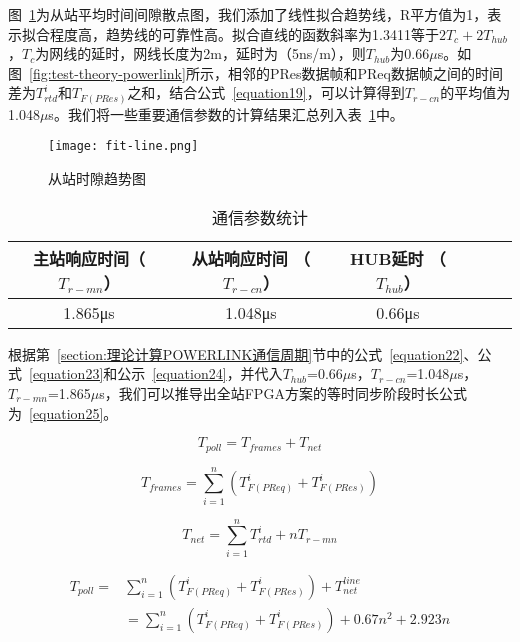 图~\ref{fig:fit-line}为从站平均时间间隙散点图，我们添加了线性拟合趋势线，R平方值为1，表示拟合程度高，趋势线的可靠性高。拟合直线的函数斜率为1.3411等于$2T_{c}+2T_{hub}$，$T_{c}$为网线的延时，网线长度为2m，延时为（5ns/m），则$T_{hub}$为0.66$\mu$s。如图~\ref{fig:test-theory-powerlink}所示，相邻的PRes数据帧和PReq数据帧之间的时间差为$T_{rtd}^{i}$和$T_{F(PRes)}$之和，结合公式~\ref{equation19}，可以计算得到$T_{r-cn}$的平均值为1.048$\mu$s。我们将一些重要通信参数的计算结果汇总列入表~\ref{table:3.2}中。

\begin{figure}[!htb]
  \centering
  \texttt{[image: fit-line.png]}
  \caption{从站时隙趋势图}
  \label{fig:fit-line}
\end{figure}

\begin{table}[hbt]
	\centering
	\caption{通信参数统计}
	\begin{tabular}{cccccc}
		\toprule
		主站响应时间（$T_{r-mn}$） & 从站响应时间 （$T_{r-cn}$）& HUB延时 （$T_{hub}$）\\
		\midrule
		1.865μs & 1.048μs & 0.66μs\\
		\bottomrule
	\end{tabular}
	\label{table:3.2}
\end{table}


根据第~\ref{section:理论计算POWERLINK通信周期}节中的公式~\ref{equation22}、公式~\ref{equation23}和公示~\ref{equation24}，并代入$T_{hub}$=0.66$\mu$s，$T_{r-cn}$=1.048$\mu$s，$T_{r-mn}$=1.865$\mu$s，我们可以推导出全站FPGA方案的等时同步阶段时长公式为~\ref{equation25}。

\begin{equation}
\label{equation22}
T_{poll}=T_{frames}+T_{net}
\end{equation}

\begin{equation}
\label{equation23}
T_{frames}=\sum_{i=1}^n(T_{F(PReq)}^{i}+T_{F(PRes)}^{i})
\end{equation}

\begin{equation}
\label{equation24}
T_{net}=\sum_{i=1}^nT_{rtd}^{i}+nT_{r-mn}
\end{equation}

\begin{equation}
\begin{split}
\label{equation25}
T_{poll}=&\sum_{i=1}^n(T_{F(PReq)}^{i}+T_{F(PRes)}^{i})+T_{net}^{line}\\
&=\sum_{i=1}^n(T_{F(PReq)}^{i}+T_{F(PRes)}^{i})+0.67n^{2}+2.923n
\end{split}
\end{equation}

